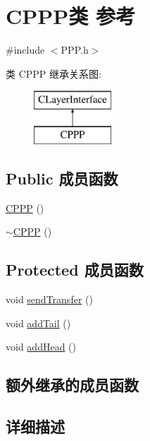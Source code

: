 \hypertarget{class_c_p_p_p}{}\section{C\+P\+P\+P类 参考}
\label{class_c_p_p_p}


{\ttfamily \#include $<$P\+P\+P.\+h$>$}

类 C\+P\+PP 继承关系图\+:\begin{figure}[H]
\begin{center}
\leavevmode
\includegraphics[height=2.000000cm]{class_c_p_p_p}
\end{center}
\end{figure}
\subsection*{Public 成员函数}
\begin{DoxyCompactItemize}
\item 
\hyperlink{class_c_p_p_p_acab476d358d55a9e8bf1618019228566}{C\+P\+PP} ()
\item 
\hyperlink{class_c_p_p_p_a27c924df735ade52f06207dcccdea395}{$\sim$\+C\+P\+PP} ()
\end{DoxyCompactItemize}
\subsection*{Protected 成员函数}
\begin{DoxyCompactItemize}
\item 
void \hyperlink{class_c_p_p_p_a1d8be0d39e44ad6e6971329106e5900d}{send\+Transfer} ()
\item 
void \hyperlink{class_c_p_p_p_a2b345908338ada3b4d9e58d14270725a}{add\+Tail} ()
\item 
void \hyperlink{class_c_p_p_p_aba6a014532e6d329cf1f8dfb591eff72}{add\+Head} ()
\end{DoxyCompactItemize}
\subsection*{额外继承的成员函数}


\subsection{详细描述}


